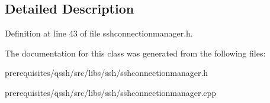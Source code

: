 \subsection{Detailed Description}


Definition at line 43 of file sshconnectionmanager.\+h.



The documentation for this class was generated from the following files\+:\begin{DoxyCompactItemize}
\item 
prerequisites/qssh/src/libs/ssh/sshconnectionmanager.\+h\item 
prerequisites/qssh/src/libs/ssh/sshconnectionmanager.\+cpp\end{DoxyCompactItemize}
